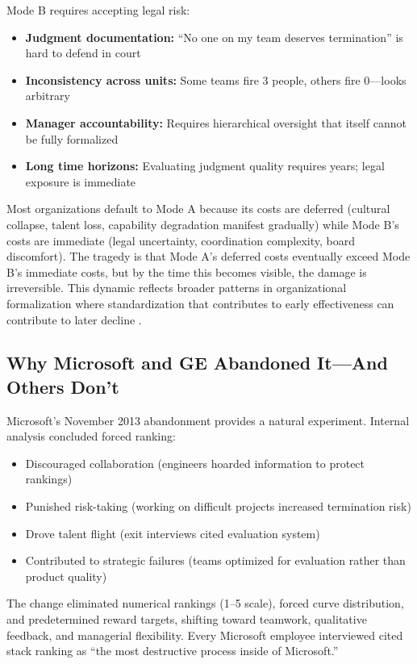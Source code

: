 \documentclass[12pt]{article}
\begin{document}
Mode B requires accepting legal risk:
\begin{itemize}
\item \textbf{Judgment documentation:} ``No one on my team deserves termination'' is hard to defend in court
\item \textbf{Inconsistency across units:} Some teams fire 3 people, others fire 0---looks arbitrary
\item \textbf{Manager accountability:} Requires hierarchical oversight that itself cannot be fully formalized
\item \textbf{Long time horizons:} Evaluating judgment quality requires years; legal exposure is immediate
\end{itemize}

Most organizations default to Mode A because its costs are deferred (cultural collapse, talent loss, capability degradation manifest gradually) while Mode B's costs are immediate (legal uncertainty, coordination complexity, board discomfort). The tragedy is that Mode A's deferred costs eventually exceed Mode B's immediate costs, but by the time this becomes visible, the damage is irreversible. This dynamic reflects broader patterns in organizational formalization where standardization that contributes to early effectiveness can contribute to later decline \citep{walsh1987formalization}.

\subsection{Why Microsoft and GE Abandoned It---And Others Don't}

Microsoft's November 2013 abandonment provides a natural experiment. Internal analysis concluded forced ranking:
\begin{itemize}
\item Discouraged collaboration (engineers hoarded information to protect rankings)
\item Punished risk-taking (working on difficult projects increased termination risk)
\item Drove talent flight (exit interviews cited evaluation system)
\item Contributed to strategic failures (teams optimized for evaluation rather than product quality)
\end{itemize}

The change eliminated numerical rankings (1--5 scale), forced curve distribution, and predetermined reward targets, shifting toward teamwork, qualitative feedback, and managerial flexibility. Every Microsoft employee interviewed cited stack ranking as ``the most destructive process inside of Microsoft.''
\end{document}
